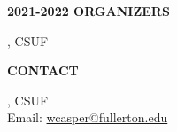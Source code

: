 \documentclass[a4paper]{article}
\begin{document}
\begin{minipage}{0.95\textwidth}
\begin{minipage}[b]{0.47\textwidth}
\medskip
\textbf{\color{csecondary}\large 2021-2022 ORGANIZERS}\par
{}, CSUF

\medskip

\textbf{\color{csecondary}\large CONTACT }\par

, CSUF\\
Email: \href{mailto:wcasper@fullerton.edu}{wcasper@fullerton.edu}

\rule{0pt}{78pt}
\end{minipage}
\vspace*{-70pt}

\end{minipage}
\end{document}

